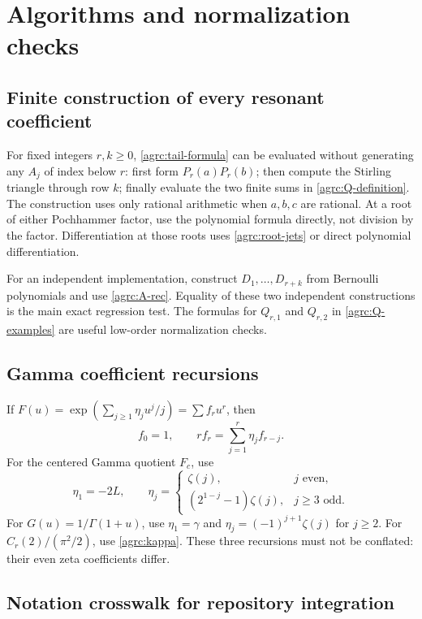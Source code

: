 \documentclass[11pt]{article}
\numberwithin{equation}{section}
\theoremstyle{definition}\newtheorem{definition}[theorem]{Definition}
\theoremstyle{remark}\newtheorem{remark}[theorem]{Remark}
\begin{document}
\appendix
\section{Algorithms and normalization checks}
\label{agrc:algorithms}

\subsection{Finite construction of every resonant coefficient}

For fixed integers $r,k\geq0$, \eqref{agrc:tail-formula} can be evaluated
without generating any $A_j$ of index below $r$:
first form $P_r(a)P_r(b)$; then compute the Stirling triangle through row
$k$; finally evaluate the two finite sums in \eqref{agrc:Q-definition}.
The construction uses only rational arithmetic when $a,b,c$ are rational.
At a root of either Pochhammer factor, use the polynomial formula
 directly, not division by the factor. Differentiation at those roots
uses \eqref{agrc:root-jets} or direct polynomial differentiation.

For an independent implementation, construct $D_1,\ldots,D_{r+k}$ from
Bernoulli polynomials and use \eqref{agrc:A-rec}. Equality of these two
independent constructions is the main exact regression test.
The formulas for $Q_{r,1}$ and $Q_{r,2}$ in
\eqref{agrc:Q-examples} are useful low-order normalization checks.

\subsection{Gamma coefficient recursions}

If $F(u)=\exp(\sum_{j\geq1}\eta_j u^j/j)=\sum f_ru^r$, then
\begin{equation}\label{agrc:general-coeff-rec}
 f_0=1,\qquad rf_r=\sum_{j=1}^r\eta_j f_{r-j}.
\end{equation}
For the centered Gamma quotient $F_c$, use
\[
 \eta_1=-2L,\qquad
 \eta_j=\begin{cases}
 \zeta(j),&j\text{ even},\\
 (2^{1-j}-1)\zeta(j),&j\geq3\text{ odd}.
 \end{cases}
\]
For $G(u)=1/\Gamma(1+u)$, use
$\eta_1=\gamma$ and $\eta_j=(-1)^{j+1}\zeta(j)$ for $j\geq2$.
For $C_r(2)/(\pi^2/2)$, use \eqref{agrc:kappa}.
These three recursions must not be conflated: their even zeta
coefficients differ.

\subsection{Notation crosswalk for repository integration}
\end{document}
